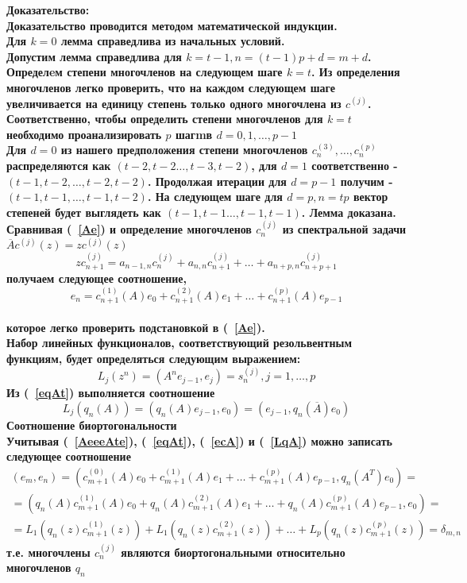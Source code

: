 \bf Доказательство: \rm \\
Доказательство проводится методом математической индукции. \\ Для
$k=0$ лемма справедлива из начальных условий. \\
Допустим лемма справедлива для $k=t-1, n = (t-1)p+d = m+d$.
Определeм степени многочленов на следующем шаге $k=t$. Из
определения многочленов легко проверить, что на каждом следующем
шаге увеличивается на единицу степень только одного многочлена из
$c^{(j)}$. Соответственно, чтобы определить степени многочленов
для $k=t$ необходимо
проанализировать $p$ шагmв $d=0,1,\ldots,p-1$ \\
Для $d=0$ из нашего предположения степени многочленов
$c_n^{(3)},\ldots,c_n^{(p)}$ распределяются как
$(t-2,t-2\ldots,t-3, t-2)$, для $d=1$ соответственно -
$(t-1,t-2,\ldots,t-2,t-2)$. Продолжая итерации для $d=p-1$ получим
- $(t-1,t-1,\ldots,t-1, t-2)$. На следующем шаге для $d=p, n=tp$
вектор степеней будет выглядеть как
$(t-1,t-1\ldots,t-1, t-1)$. Лемма доказана. \\
Сравнивая (~\ref{Ae}) и определение многочленов $c^{(j)}_n$ из
спектральной задачи $\overline{A}c^{(j)}(z)=zc^{(j)}(z)$
$$%
zc^{(j)}_{n+1}=a_{n-1,n}c^{(j)}_{n}+a_{n,n}c^{(j)}_{n+1}+\ldots+a_{n+p,n}c^{(j)}_{n+p+1}
$$%
получаем следующее соотношение,
\begin{equation}
\label{ecA}
e_{n}=c_{n+1}^{(1)}(A)e_0+c_{n+1}^{(2)}(A)e_1+\ldots+c_{n+1}^{(p)}(A)e_{p-1}
\end{equation} \\
которое легко проверить подстановкой в (~\ref{Ae}).\\
Набор линейных функционалов, соответствующий резольвентным
функциям, будет определяться следующим выражением:
$$%
L_j(z^n)=(A^ne_{j-1},e_j)=s_n^{(j)},j=1,\ldots,p
$$%
Из (~\ref{eqAt}) выполняется соотношение
\begin{equation}
\label{LqA}
L_j(q_n(A))=(q_n(A)e_{j-1},e_0)=(e_{j-1},q_n(\overline{A})e_0)
\end{equation}
\bf Соотношение биортогональности \rm \\
Учитывая (~\ref{AeeeAte}), (~\ref{eqAt}), (~\ref{ecA}) и
(~\ref{LqA}) можно записать следующее соотношение \\
\begin{eqnarray}
\label{Bio}
(e_m,e_n)=(c_{m+1}^{(0)}(A)e_0+c_{m+1}^{(1)}(A)e_1+\ldots+c_{m+1}^{(p)}(A)e_{p-1},q_n(A^{T})e_0)=\nonumber\\
=(q_n(A)c_{m+1}^{(1)}(A)e_0+q_n(A)c_{m+1}^{(2)}(A)e_1+\ldots+q_n(A)c_{m+1}^{(p)}(A)e_{p-1},e_0)=\\
=L_1(q_n(z)c_{m+1}^{(1)}(z))+L_1(q_n(z)c_{m+1}^{(2)}(z))+\ldots+L_p(q_n(z)c_{m+1}^{(p)}(z))=\delta_{m,n}\nonumber
\end{eqnarray}
т.е. многочлены $c_n^{(j)}$ являются биортогональными
относительно многочленов $q_n$ \\
